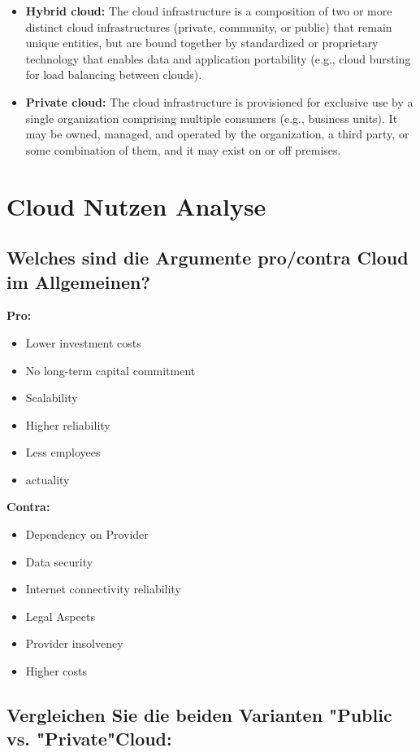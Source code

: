 \documentclass[a4,12pt]{scrartcl}
\begin{document}
\begin{itemize}
\item \textbf{Hybrid cloud:} The cloud infrastructure is a composition of two or more distinct cloud infrastructures (private, community, or public) that remain unique entities, but are bound together by standardized or proprietary technology that enables data and application portability (e.g., cloud bursting for load balancing between clouds).

\item \textbf{Private cloud:} The cloud infrastructure is provisioned for exclusive use by a single organization comprising multiple consumers (e.g., business units). It may be owned, managed, and operated by the organization, a third party, or some combination of them, and it may exist on or off premises.
\end{itemize}

\section{Cloud Nutzen Analyse}
\subsection{Welches sind die Argumente pro/contra Cloud im Allgemeinen?}
\textbf{Pro:}
\begin{itemize}
\item Lower investment costs
\item No long-term capital commitment
\item Scalability
\item Higher reliability
\item Less employees 
\item actuality
\end{itemize}

\textbf{Contra:}
\begin{itemize}
\item Dependency on Provider
\item Data security
\item Internet connectivity reliability
\item Legal Aspects
\item Provider insolvency 
\item Higher costs
\end{itemize}

\subsection{Vergleichen Sie die beiden Varianten "Public vs. "Private"Cloud:}
\end{document}
